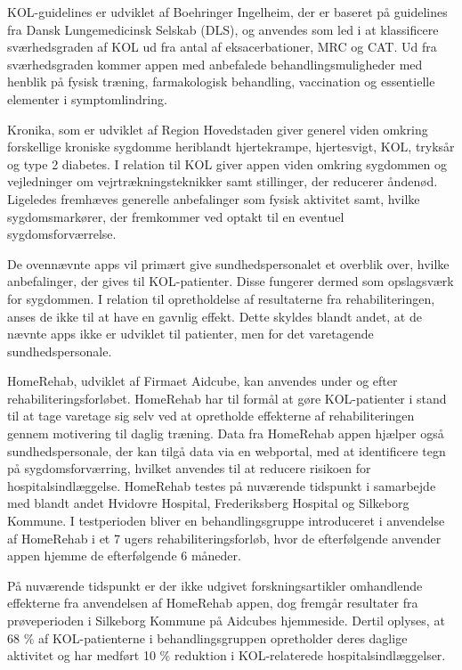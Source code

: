 KOL-guidelines er udviklet af Boehringer Ingelheim, der er baseret på guidelines fra Dansk Lungemedicinsk Selskab (DLS), og anvendes som led i at klassificere sværhedsgraden af KOL ud fra antal af eksacerbationer, MRC og CAT. Ud fra sværhedsgraden kommer appen med anbefalede behandlingsmuligheder med henblik på fysisk træning, farmakologisk behandling, vaccination og essentielle elementer i symptomlindring.\cite{KOLguidelines}    

Kronika, som er udviklet af Region Hovedstaden giver generel viden omkring forskellige kroniske sygdomme heriblandt hjertekrampe, hjertesvigt, KOL, tryksår og type 2 diabetes. I relation til KOL giver appen viden omkring sygdommen og vejledninger om vejrtrækningsteknikker samt stillinger, der reducerer åndenød. Ligeledes fremhæves generelle anbefalinger som fysisk aktivitet samt,  hvilke sygdomsmarkører, der fremkommer ved optakt til en eventuel sygdomsforværrelse.\cite{kronika}    

De ovennævnte apps vil primært give sundhedspersonalet et overblik over, hvilke anbefalinger, der gives til KOL-patienter. Disse fungerer dermed som opslagsværk for sygdommen. I relation til opretholdelse af resultaterne fra rehabiliteringen, anses de ikke til at have en gavnlig effekt. 
Dette skyldes blandt andet, at de nævnte apps ikke er udviklet til patienter, men for det varetagende sundhedspersonale.\cite{kronika2014}  

HomeRehab, udviklet af Firmaet Aidcube, kan anvendes under og efter rehabiliteringsforløbet. HomeRehab har til formål at gøre KOL-patienter i stand til at tage varetage sig selv ved at opretholde effekterne af rehabiliteringen gennem motivering til daglig træning. Data fra HomeRehab appen hjælper også sundhedspersonale, der kan tilgå data via en webportal, med at identificere tegn på sygdomsforværring, hvilket anvendes til at reducere risikoen for hospitalsindlæggelse. HomeRehab testes på nuværende tidspunkt i samarbejde med blandt andet Hvidovre Hospital, Frederiksberg Hospital og Silkeborg Kommune. 
I testperioden bliver en behandlingsgruppe introduceret i anvendelse af HomeRehab i et 7 ugers rehabiliteringsforløb, hvor de efterfølgende anvender appen hjemme de efterfølgende 6 måneder.\cite{HealthcareDenmark2017}

På nuværende tidspunkt er der ikke udgivet forskningsartikler omhandlende effekterne fra anvendelsen af HomeRehab appen, dog fremgår resultater fra prøveperioden i Silkeborg Kommune på Aidcubes hjemmeside. Dertil oplyses, at 68 \% af KOL-patienterne i behandlingsgruppen opretholder deres daglige aktivitet og har medført 10 \% reduktion i KOL-relaterede hospitalsindlæggelser.\cite{AidCube2017}
